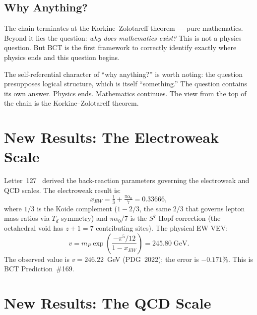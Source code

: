 \documentclass[aps,prl,twocolumn,showpacs,preprintnumbers]{revtex4-2}
\newcommand{\azero}{\alpha_0}
\newcommand{\mP}{m_P}
\begin{document}
\subsection{Why Anything?}

The chain terminates at the Korkine--Zolotareff theorem --- pure
mathematics.
Beyond it lies the question: \textit{why does mathematics exist?}
This is not a physics question. But BCT is the first framework
to correctly identify exactly where physics ends and this question
begins.

The self-referential character of ``why anything?'' is worth noting:
the question presupposes logical structure, which is itself
``something.'' The question contains its own answer.
Physics ends. Mathematics continues.
The view from the top of the chain is the Korkine--Zolotareff theorem.

\section{New Results: The Electroweak Scale}

Letter~127~\cite{letter127} derived the back-reaction parameters
governing the electroweak and QCD scales. The electroweak result is:
\begin{equation}
  x_{EW} = \tfrac{1}{3} + \tfrac{\pi\azero}{7} = 0.33666,
  \label{eq:xEW}
\end{equation}
where $1/3$ is the Koide complement ($1 - 2/3$, the same $2/3$
that governs lepton mass ratios via $T_d$ symmetry) and
$\pi\azero/7$ is the $S^7$ Hopf correction
(the octahedral void has $z+1 = 7$ contributing sites).
The physical EW VEV:
\begin{equation}
  v = \mP\exp\!\left(\frac{-\pi^5/12}{1-x_{EW}}\right)
  = 245.80\;\text{GeV}.
  \label{eq:v}
\end{equation}
The observed value is $v = 246.22$~GeV (PDG~2022);
the error is $-0.171\%$. This is BCT Prediction~\#169.

\section{New Results: The QCD Scale}
\end{document}
